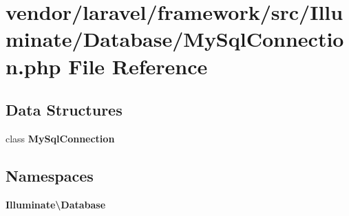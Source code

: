 \section{vendor/laravel/framework/src/\+Illuminate/\+Database/\+My\+Sql\+Connection.php File Reference}
\label{_my_sql_connection_8php}
\subsection*{Data Structures}
\begin{DoxyCompactItemize}
\item 
class {\bf My\+Sql\+Connection}
\end{DoxyCompactItemize}
\subsection*{Namespaces}
\begin{DoxyCompactItemize}
\item 
 {\bf Illuminate\textbackslash{}\+Database}
\end{DoxyCompactItemize}
